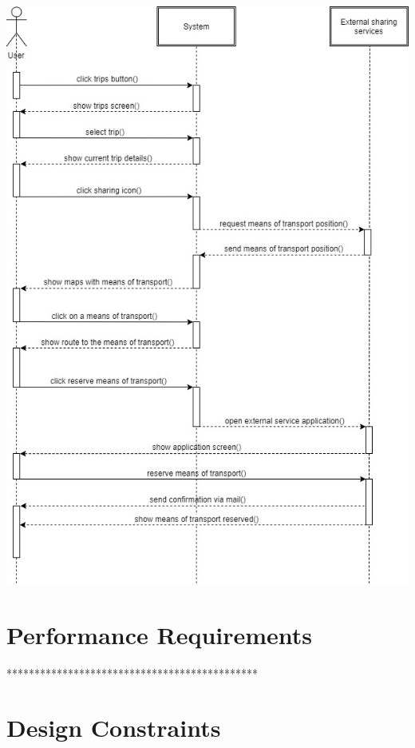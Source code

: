 \begin{center}
\includegraphics[scale=0.55]{MainMatter/images/sequencediagrams/reservesharing}
\end{center}
%
%
\section{Performance Requirements}
********************************************* 
%
\section{Design Constraints}

